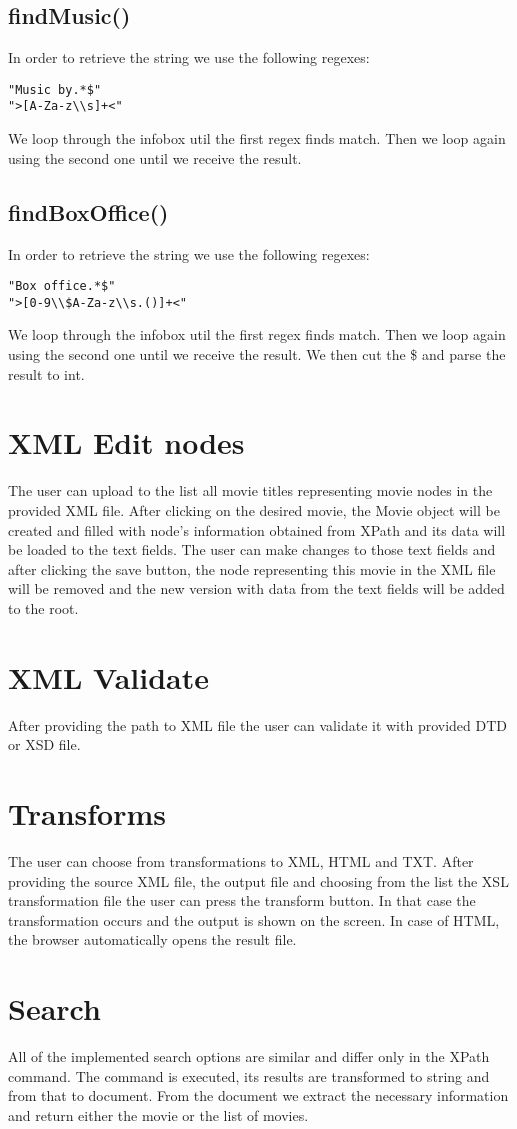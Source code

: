 \documentclass[a4paper,12pt]{article}
\begin{document}
\subsection{findMusic()}
In order to retrieve the string we use the following regexes:
\begin{lstlisting}
"Music by.*$"
">[A-Za-z\\s]+<"
\end{lstlisting}
We loop through the infobox util the first regex finds match. Then we loop again using the second one until we receive the result.

\subsection{findBoxOffice()}
In order to retrieve the string we use the following regexes:
\begin{lstlisting}
"Box office.*$"
">[0-9\\$A-Za-z\\s.()]+<"
\end{lstlisting}
We loop through the infobox util the first regex finds match. Then we loop again using the second one until we receive the result. We then cut the \$ and parse the result to int.

\section{XML Edit nodes}
The user can upload to the list all movie titles representing movie nodes in the provided XML file. After clicking on the desired movie, the Movie object will be created and filled with node's information obtained from XPath and its data will be loaded to the text fields. The user can make changes to those text fields and after clicking the save button, the node representing this movie in the XML file will be removed and the new version with data from the text fields will be added to the root.

\section{XML Validate}
After providing the path to XML file the user can validate it with provided DTD or XSD file.

\section{Transforms}
The user can choose from transformations to XML, HTML and TXT. After providing the source XML file, the output file and choosing from the list the XSL transformation file the user can press the transform button. In that case the transformation occurs and the output is shown on the screen. In case of HTML, the browser automatically opens the result file.


\section{Search}
All of the implemented search options are similar and differ only in the XPath command. The command is executed, its results are transformed to string and from that to document. From the document we extract the necessary information and return either the movie or the list of movies.
\end{document}
